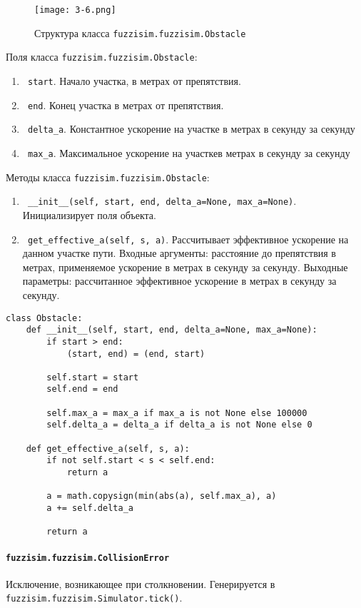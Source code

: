 \begin{figure}[ht]
	\centering
	\texttt{[image: 3-6.png]}
	\caption{ Структура класса \lstinline!fuzzisim.fuzzisim.Obstacle!}
\end{figure}

Поля класса \lstinline!fuzzisim.fuzzisim.Obstacle!:
\begin{enumerate}[label=\arabic*)]
	\item \lstinline! start!. Начало участка, в метрах от препятствия.
	\item \lstinline! end!. Конец участка в метрах от препятствия.
	\item \lstinline! delta_a!. Константное ускорение на участке в метрах в секунду за секунду
	\item \lstinline! max_a!.  Максимальное ускорение на участкев метрах в секунду за секунду
\end{enumerate}

Методы класса \lstinline!fuzzisim.fuzzisim.Obstacle!:
\begin{enumerate}[label=\arabic*)]
	\item \lstinline! __init__(self, start, end, delta_a=None, max_a=None)!. Инициализирует поля объекта.
	\item \lstinline! get_effective_a(self, s, a)!.  Рассчитывает эффективное ускорение на данном участке пути. Входные аргументы: расстояние до препятствия в метрах, применяемое ускорение в метрах в секунду за секунду. Выходные параметры: рассчитанное эффективное ускорение в метрах в секунду за секунду.
\end{enumerate}

\begin{lstlisting}[style=pythonstyle,caption={  }, label=lst:func:1]
class Obstacle:
	def __init__(self, start, end, delta_a=None, max_a=None):
		if start > end:
			(start, end) = (end, start)

		self.start = start
		self.end = end
		
		self.max_a = max_a if max_a is not None else 100000
		self.delta_a = delta_a if delta_a is not None else 0

	def get_effective_a(self, s, a):
		if not self.start < s < self.end:
			return a

		a = math.copysign(min(abs(a), self.max_a), a)
		a += self.delta_a

		return a
\end{lstlisting}




\paragraph{\lstinline!fuzzisim.fuzzisim.CollisionError!}
Исключение, возникающее при столкновении. Генерируется в \lstinline!fuzzisim.fuzzisim.Simulator.tick()!.

